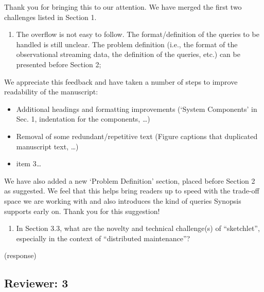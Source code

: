 \documentclass{article}
\begin{document}
\begin{tcolorbox}
Thank you for bringing this to our attention. We have merged the first
two challenges listed in Section 1.
\end{tcolorbox}

\begin{enumerate}
\def\labelenumi{(\arabic{enumi})}
\setcounter{enumi}{1}
\item
  The overflow is not easy to follow. The format/definition of the
  queries to be handled is still unclear. The problem definition (i.e.,
  the format of the observational streaming data, the definition of the
  queries, etc.) can be presented before Section 2;
\end{enumerate}

\begin{tcolorbox}
We appreciate this feedback and have taken a number of steps to improve
readability of the manuscript:

\begin{itemize}
\item
  Additional headings and formatting improvements (`System Components'
  in Sec. 1, indentation for the components, \ldots{})
\item
  Removal of some redundant/repetitive text (Figure captions that
  duplicated manuscript text, \ldots{})
\item
  item 3\ldots{}
\end{itemize}

We have also added a new `Problem Definition' section, placed before
Section 2 as suggested. We feel that this helps bring readers up to
speed with the trade-off space we are working with and also introduces
the kind of queries Synopsis supports early on. Thank you for this
suggestion!
\end{tcolorbox}

\begin{enumerate}
\def\labelenumi{(\arabic{enumi})}
\setcounter{enumi}{2}
\item
  In Section 3.3, what are the novelty and technical challenge(s) of
  ``sketchlet'', especially in the context of ``distributed
  maintenance''?
\end{enumerate}

\begin{tcolorbox}
(response)
\end{tcolorbox}

\subsection*{Reviewer: 3}\label{reviewer-3}
\end{document}
